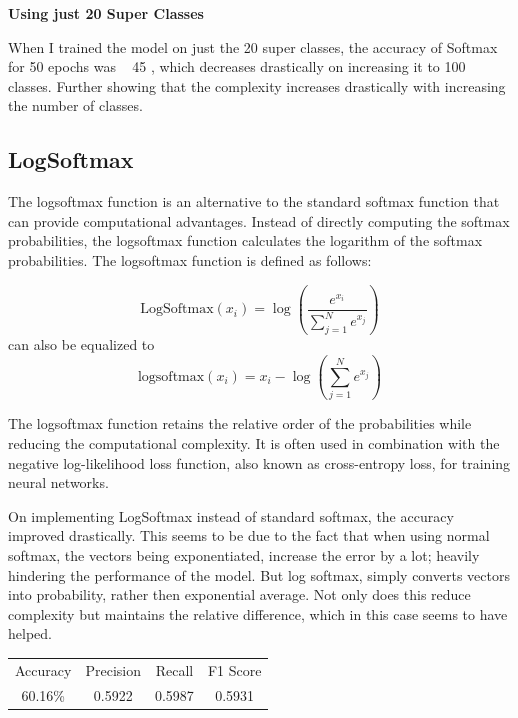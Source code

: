 \documentclass{article}
\begin{document}
\textbf{Using just 20 Super Classes}

When I trained the model on just the 20 super classes, the accuracy of Softmax for 50 epochs was ~ 45 , which decreases drastically on increasing it to 100 classes. Further showing that the complexity increases drastically with increasing the number of classes.

\subsection{LogSoftmax}


The logsoftmax function is an alternative to the standard softmax function that can provide computational advantages. Instead of directly computing the softmax probabilities, the logsoftmax function calculates the logarithm of the softmax probabilities. The logsoftmax function is defined as follows:

\[
\text{LogSoftmax}(x_i) = \log\left(\frac{e^{x_i}}{\sum_{j=1}^N e^{x_j}}\right)
\]
can also be equalized to
\[
\text{logsoftmax}(x_i) = x_i - \log\left(\sum_{j=1}^{N}e^{x_j}\right)
\]

The logsoftmax function retains the relative order of the probabilities while reducing the computational complexity. It is often used in combination with the negative log-likelihood loss function, also known as cross-entropy loss, for training neural networks.

On implementing LogSoftmax instead of standard softmax, the accuracy improved drastically. This seems to be due to the fact that when using normal softmax, the vectors being exponentiated, increase the error by a lot; heavily hindering the performance of the model. But log softmax, simply converts vectors into probability, rather then exponential average. Not only does this reduce complexity but maintains the relative difference, which in this case seems to have helped.

\begin{center}
\begin{tabular}{ |c|c|c|c| } 
 \hline
 Accuracy & Precision & Recall & F1 Score \\ 
 60.16\% & 0.5922 & 0.5987 & 0.5931 \\
 \hline
\end{tabular}
\end{center}
\end{document}
